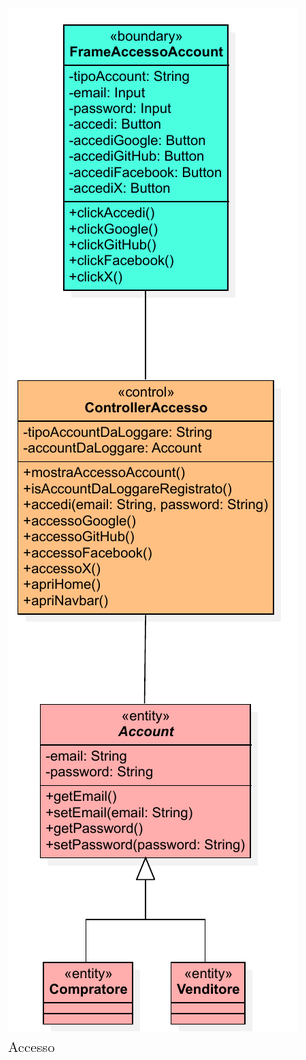             \begin{figure}[htbp!]
                \centering
                    \includegraphics[width=0.35\linewidth]{Immagini/Diagrammi/Class Diagram/Analisi/Utente che non ha effettuato l'accesso/Accesso.pdf}
                \caption{Accesso}
            \end{figure}
            
